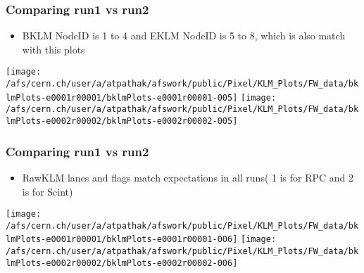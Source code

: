 \documentclass{beamer}
\begin{document}
\begin{frame}
\frametitle{Comparing run1 vs run2}
\vspace*{.05cm}

\begin{itemize} 
\item {\small BKLM NodeID is 1 to 4 and EKLM NodeID is 5 to 8, which is also match with this plots}
\end{itemize}

\begin{center}
\begin{normalsize}

\vspace*{-.2cm}
\begin{center}

\texttt{[image: /afs/cern.ch/user/a/atpathak/afswork/public/Pixel/KLM\_Plots/FW\_data/bklmPlots-e0001r00001/bklmPlots-e0001r00001-005]}
\texttt{[image: /afs/cern.ch/user/a/atpathak/afswork/public/Pixel/KLM\_Plots/FW\_data/bklmPlots-e0002r00002/bklmPlots-e0002r00002-005]} \\

\end{center}
\end{normalsize}
\end{center}
\end{frame}
\begin{frame}
\frametitle{Comparing run1 vs run2}
\vspace*{.05cm}

\begin{itemize} 
\item {\small RawKLM lanes and flags match expectations in all runs( 1 is for RPC and 2 is for Scint)}
\end{itemize}

\begin{center}
\begin{normalsize}

\vspace*{-.2cm}
\begin{center}

\texttt{[image: /afs/cern.ch/user/a/atpathak/afswork/public/Pixel/KLM\_Plots/FW\_data/bklmPlots-e0001r00001/bklmPlots-e0001r00001-006]}
\texttt{[image: /afs/cern.ch/user/a/atpathak/afswork/public/Pixel/KLM\_Plots/FW\_data/bklmPlots-e0002r00002/bklmPlots-e0002r00002-006]} \\

\end{center}
\end{normalsize}
\end{center}
\end{frame}
\end{document}
